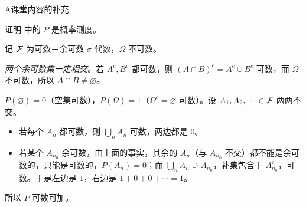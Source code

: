 \label{hw:measures}


\begin{exercises}{A}{课堂内容的补充}
\item\label{ex:measures:A1} 证明 中的 $P$ 是概率测度。
\begin{solution}
记 $\mathcal{F}$ 为可数－余可数 $\sigma$-代数，$\Omega$ 不可数。

\emph{两个余可数集一定相交。}若 $A^c,B^c$ 都可数，则 $(A\cap B)^c=A^c\cup B^c$ 可数，而 $\Omega$ 不可数，所以 $A\cap B\neq\varnothing$。

$P(\varnothing)=0$（空集可数），$P(\Omega)=1$（$\Omega^c=\varnothing$ 可数）。设 $A_1,A_2,\dots\in\mathcal{F}$ 两两不交。
\begin{itemize}
\item 若每个 $A_n$ 都可数，则 $\bigcup_nA_n$ 可数，两边都是 $0$。
\item 若某个 $A_{n_0}$ 余可数，由上面的事实，其余的 $A_n$（与 $A_{n_0}$ 不交）都不能是余可数的，只能是可数的，$P(A_n)=0$；而 $\bigcup_nA_n\supseteq A_{n_0}$，补集包含于 $A_{n_0}^c$，可数。于是左边是 $1$，右边是 $1+0+0+\cdots=1$。
\end{itemize}
所以 $P$ 可数可加。
\end{solution}


\end{exercises}
